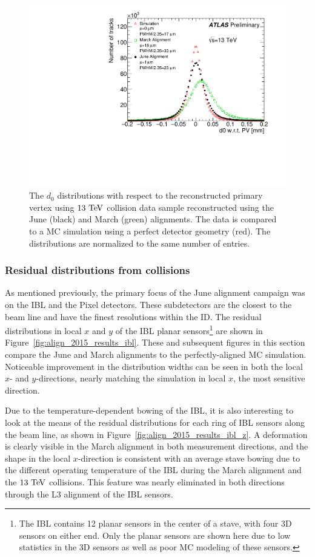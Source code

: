 \begin{figure}[htbp]
  \centering
  \includegraphics[width=.48\textwidth]{figs/alignment/align2015/d0_pvcorr}
  \caption{The $d_0$ distributions with respect to the reconstructed primary vertex using $13\tev$ collision data sample reconstructed using the June (black) and March (green) alignments.  The data is compared to a MC simulation using a perfect detector geometry (red).  The distributions are normalized to the same number of entries.}
  \label{fig:align_2015_results_d0}
\end{figure}

\subsubsection{Residual distributions from collisions}\label{align:2015_results_residual}
As mentioned previously, the primary focus of the June alignment campaign was on the IBL and the Pixel detectors.
These subdetectors are the closest to the beam line and have the finest resolutions within the ID.
The residual distributions in local $x$ and $y$ of the IBL planar sensors\footnote{The IBL contains 12 planar sensors in the center of a stave, with four 3D sensors on either end.  Only the planar sensors are shown here due to low statistics in the 3D sensors as well as poor MC modeling of these sensors.} are shown in Figure~\ref{fig:align_2015_results_ibl}.
These and subsequent figures in this section compare the June and March alignments to the perfectly-aligned MC simulation.
Noticeable improvement in the distribution widths can be seen in both the local $x$- and $y$-directions, nearly matching the simulation in local $x$, the most sensitive direction.

Due to the temperature-dependent bowing of the IBL, it is also interesting to look at the means of the residual distributions for each ring of IBL sensors along the beam line, as shown in Figure~\ref{fig:align_2015_results_ibl_z}.
A deformation is clearly visible in the March alignment in both measurement directions, and the shape in the local $x$-direction is consistent with an average stave bowing due to the different operating temperature of the IBL during the March alignment and the $13\tev$ collisions.
This feature was nearly eliminated in both directions through the L3 alignment of the IBL sensors.

